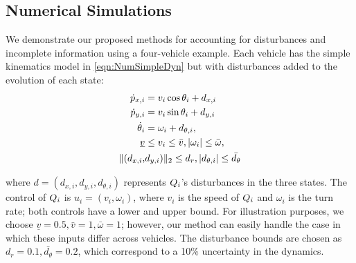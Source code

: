\subsection{Numerical Simulations \label{sec:sim_dstb}}
We demonstrate our proposed methods for accounting for disturbances and incomplete information using a four-vehicle example. Each vehicle has the simple kinematics model in \eqref{eqn:NumSimpleDyn} but with disturbances added to the evolution of each state:
\begin{equation}
\label{eq:dyn_i}
\begin{aligned}
\dot{\pos}_{x,i} &= v_i \cos \theta_i + d_{x,i} \\
\dot{\pos}_{y,i} &= v_i \sin \theta_i + d_{y,i}\\
\dot{\theta}_i &= \omega_i + d_{\theta,i}, \\
\underline{v} & \le v_i \le \bar{v}, |\omega_i| \le \bar{\omega},\\
\|(d_{x,i}, & d_{y,i}) \|_2 \le d_{r}, |d_{\theta,i}| \le \bar{d_{\theta}}
\end{aligned}
\end{equation}

\noindent where $d = (d_{x,i}, d_{y,i}, d_{\theta,i})$ represents $Q_i$'s disturbances in the three states. The control of $Q_i$ is $u_i = (v_i, \omega_i)$, where $v_i$ is the speed of $Q_i$ and $\omega_i$ is the turn rate; both controls have a lower and upper bound. For illustration purposes, we choose $\underline{v} = 0.5, \bar{v} = 1, \bar\omega = 1$; however, our method can easily handle the case in which these inputs differ across vehicles. The disturbance bounds are chosen as $d_r = 0.1, \bar{d_{\theta}} = 0.2$, which correspond to a 10\% uncertainty in the dynamics. %

%

